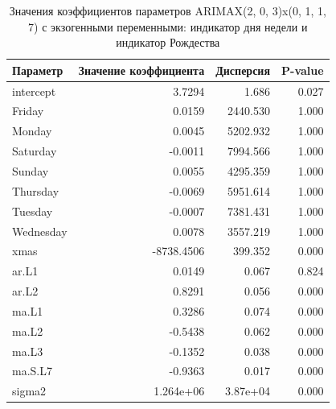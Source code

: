 \begin{table}%
    \caption{Значения коэффициентов параметров ARIMAX(2, 0, 3)x(0, 1, 1, 7) с экзогенными переменными: индикатор дня недели и индикатор Рождества}
    \centering
    \begin{tabular}{|l|r||r|r|}
        \hline
            Параметр           &     Значение коэффициента  &  Дисперсия  &  P-value \\
        \hline
            intercept          &     3.7294                 &     1.686 &   0.027 \\
            Friday             &     0.0159                 &  2440.530 &   1.000 \\
            Monday             &     0.0045                 &  5202.932 &   1.000 \\
            Saturday           &    -0.0011                 &  7994.566 &   1.000 \\
            Sunday             &     0.0055                 &  4295.359 &   1.000 \\
            Thursday           &    -0.0069                 &  5951.614 &   1.000 \\
            Tuesday            &    -0.0007                 &  7381.431 &   1.000 \\
            Wednesday          &     0.0078                 &  3557.219 &   1.000 \\
            xmas               & -8738.4506                 &   399.352 &   0.000 \\
            ar.L1              &     0.0149                 &     0.067 &   0.824 \\
            ar.L2              &     0.8291                 &     0.056 &   0.000 \\
            ma.L1              &     0.3286                 &     0.074 &   0.000 \\
            ma.L2              &    -0.5438                 &     0.062 &   0.000 \\
            ma.L3              &    -0.1352                 &     0.038 &   0.000 \\
            ma.S.L7            &    -0.9363                 &     0.017 &   0.000 \\
            sigma2             &  1.264e+06                 &  3.87e+04 &   0.000 \\
        \hline
    \end{tabular}
    \label{tbl:arimax_coeffs_exogen}
\end{table}

